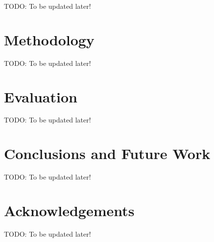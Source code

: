 \documentclass[sigconf]{acmart}
\newcommand{\todo}[1][To be updated later!]{{\color{red} TODO: {#1}}}
\begin{document}
\todo


\section{Methodology}

\todo


\section{Evaluation}

\todo


\section{Conclusions and Future Work}

\todo


\section{Acknowledgements}

\todo



 
\end{document}
